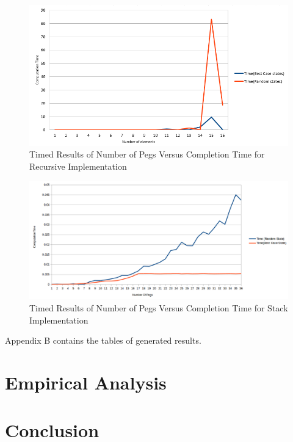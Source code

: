 \documentclass[a4paper]{article}
\begin{document}
\begin{figure}[H]
	\centering
	\label{recursive}
	\includegraphics[width=.90\textwidth,scale=.90]{images/Recursive}
	\caption{Timed Results of Number of Pegs Versus Completion Time for Recursive Implementation}
\end{figure}

\begin{figure}[H]
	\centering
	\label{avgnumpegs}
	\includegraphics[width=.90\textwidth,scale=.90]{images/Stack}
	\caption{Timed Results of Number of Pegs Versus Completion Time for Stack Implementation}
\end{figure}

\noindent Appendix B contains the tables of generated results.

\section{Empirical Analysis}


\section{Conclusion}
\end{document}
